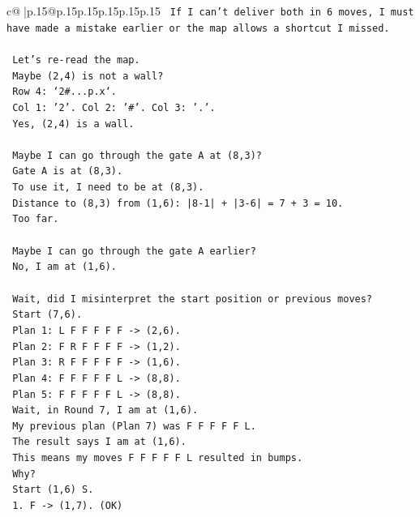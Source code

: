 \documentclass{article}
\begin{document}
{\begin{supertabular}{c@{$\;$}|p{.15\linewidth}@{}p{.15\linewidth}p{.15\linewidth}p{.15\linewidth}p{.15\linewidth}p{.15\linewidth}}
{{{\texttt{      If I can't deliver both in 6 moves, I must have made a mistake earlier or the map allows a shortcut I missed.} \\
\\ 
\texttt{      Let's re{-}read the map.} \\
\texttt{      Maybe (2,4) is not a wall?} \\
\texttt{      Row 4: `2\#...p.x`.} \\
\texttt{      Col 1: '2'. Col 2: '\#'. Col 3: '.'.} \\
\texttt{      Yes, (2,4) is a wall.} \\
\\ 
\texttt{      Maybe I can go through the gate A at (8,3)?} \\
\texttt{      Gate A is at (8,3).} \\
\texttt{      To use it, I need to be at (8,3).} \\
\texttt{      Distance to (8,3) from (1,6): |8{-}1| + |3{-}6| = 7 + 3 = 10.} \\
\texttt{      Too far.} \\
\\ 
\texttt{      Maybe I can go through the gate A earlier?} \\
\texttt{      No, I am at (1,6).} \\
\\ 
\texttt{      Wait, did I misinterpret the start position or previous moves?} \\
\texttt{      Start (7,6).} \\
\texttt{      Plan 1: L F F F F F {-}> (2,6).} \\
\texttt{      Plan 2: F R F F F F {-}> (1,2).} \\
\texttt{      Plan 3: R F F F F F {-}> (1,6).} \\
\texttt{      Plan 4: F F F F F L {-}> (8,8).} \\
\texttt{      Plan 5: F F F F F L {-}> (8,8).} \\
\texttt{      Wait, in Round 7, I am at (1,6).} \\
\texttt{      My previous plan (Plan 7) was F F F F F L.} \\
\texttt{      The result says I am at (1,6).} \\
\texttt{      This means my moves F F F F F L resulted in bumps.} \\
\texttt{      Why?} \\
\texttt{      Start (1,6) S.} \\
\texttt{      1. F {-}> (1,7). (OK)} \\
}}}
\end{supertabular}}
\end{document}
